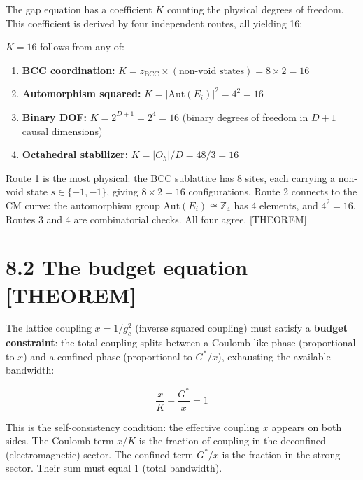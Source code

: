 \documentclass[
  11pt,
  letterpaper,
  twoside,
  openright]{book}
\providecommand{\tightlist}{%
  \setlength{\itemsep}{0pt}\setlength{\parskip}{0pt}}
\begin{document}
The gap equation has a coefficient \(K\) counting the physical degrees
of freedom. This coefficient is derived by four independent routes, all
yielding 16:

\begin{ftdtheorem}

\(K = 16\) follows from any of:

\begin{enumerate}
\def\labelenumi{\arabic{enumi}.}
\tightlist
\item
  \textbf{BCC coordination:}
  \(K = z_{\text{BCC}} \times (\text{non-void states}) = 8 \times 2 = 16\)
\item
  \textbf{Automorphism squared:} \(K = |\text{Aut}(E_i)|^2 = 4^2 = 16\)
\item
  \textbf{Binary DOF:} \(K = 2^{D+1} = 2^4 = 16\) (binary degrees of
  freedom in \(D+1\) causal dimensions)
\item
  \textbf{Octahedral stabilizer:} \(K = |O_h|/D = 48/3 = 16\)
\end{enumerate}

\end{ftdtheorem}

Route 1 is the most physical: the BCC sublattice has 8 sites, each
carrying a non-void state \(s \in \{+1, -1\}\), giving
\(8 \times 2 = 16\) configurations. Route 2 connects to the CM curve:
the automorphism group \(\text{Aut}(E_i) \cong \mathbb{Z}_4\) has 4
elements, and \(4^2 = 16\). Routes 3 and 4 are combinatorial checks. All
four agree. {[}THEOREM{]}

\section{8.2 The budget equation
{[}THEOREM{]}}\label{the-budget-equation-theorem}

The lattice coupling \(x = 1/g_c^2\) (inverse squared coupling) must
satisfy a \textbf{budget constraint}: the total coupling splits between
a Coulomb-like phase (proportional to \(x\)) and a confined phase
(proportional to \(G^*/x\)), exhausting the available bandwidth:

\[
\frac{x}{K} + \frac{G^*}{x} = 1
\tag{8.1}
\]

This is the self-consistency condition: the effective coupling \(x\)
appears on both sides. The Coulomb term \(x/K\) is the fraction of
coupling in the deconfined (electromagnetic) sector. The confined term
\(G^*/x\) is the fraction in the strong sector. Their sum must equal 1
(total bandwidth).
\end{document}
